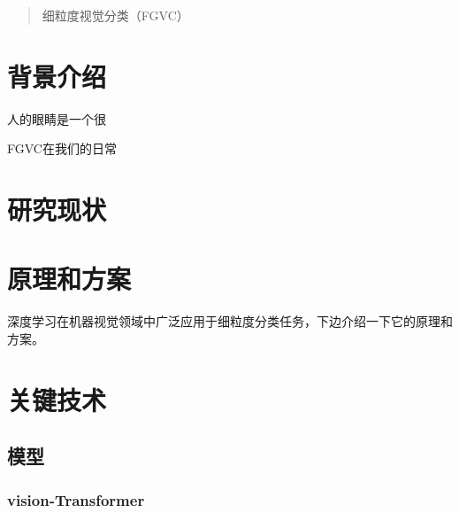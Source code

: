 \documentclass[UTF8,a4paper,10pt]{ctexart}
\begin{document}
 \renewcommand\figurename{图}


 
\begin{abstract}
细粒度视觉分类（FGVC）
\end{abstract}
 
 
\section{背景介绍}
人的眼睛是一个很


FGVC在我们的日常

\section{研究现状}


\section{原理和方案}
深度学习在机器视觉领域中广泛应用于细粒度分类任务，下边介绍一下它的原理和方案。


\section{关键技术}
\subsection{模型}
\subsubsection{vision-Transformer}
\end{document}
